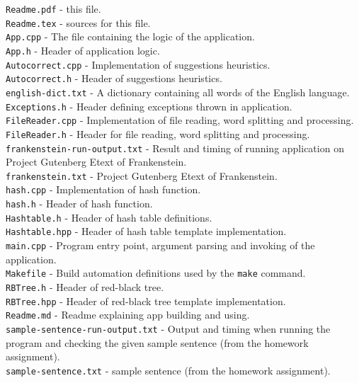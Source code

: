 \documentclass[a4paper]{article}
\begin{document}
\texttt{Readme.pdf} - this file.\\
\texttt{Readme.tex} - sources for this file.\\
\texttt{App.cpp} - The file containing the logic of the application.\\
\texttt{App.h} - Header of application logic.\\
\texttt{Autocorrect.cpp} - Implementation of suggestions heuristics.\\
\texttt{Autocorrect.h} - Header of suggestions heuristics.\\
\texttt{english-dict.txt} - A dictionary containing all words of the English language.\\
\texttt{Exceptions.h} - Header defining exceptions thrown in application.\\
\texttt{FileReader.cpp} - Implementation of file reading, word splitting and processing.\\
\texttt{FileReader.h} - Header for file reading, word splitting and processing.\\
\texttt{frankenstein-run-output.txt} - Result and timing of running application on Project Gutenberg Etext of Frankenstein.\\
\texttt{frankenstein.txt} - Project Gutenberg Etext of Frankenstein.\\
\texttt{hash.cpp} - Implementation of hash function.\\
\texttt{hash.h} - Header of hash function.\\
\texttt{Hashtable.h} - Header of hash table definitions.\\
\texttt{Hashtable.hpp} - Header of hash table template implementation.\\
\texttt{main.cpp} - Program entry point, argument parsing and invoking of the application.\\
\texttt{Makefile} - Build automation definitions used by the \texttt{make} command.\\
\texttt{RBTree.h} - Header of red-black tree.\\
\texttt{RBTree.hpp} - Header of red-black tree template implementation.\\
\texttt{Readme.md} - Readme explaining app building and using.\\
\texttt{sample-sentence-run-output.txt} - Output and timing when running the program and checking the given sample sentence (from the homework assignment).\\
\texttt{sample-sentence.txt} - sample sentence (from the homework assignment).\\
\end{document}
